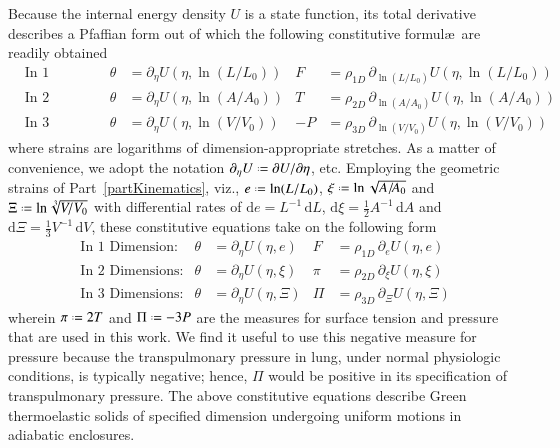 Because the internal energy density $U$ is a state function, its total derivative describes a Pfaffian form \cite{Caratheodory09} out of which the following constitutive formul\ae\ are readily obtained
\begin{subequations}
    \label{GreenElasticCEs}
    \begin{align}
    \mbox{} & \text{In 1 Dimension:} & 
    \theta & = \partial_{\eta} U ( \eta , \ln (L/L_0)) &
    F & = \rho_{1D} \, \partial_{\ln(L/L_0)} U ( \eta , \ln (L/L_0) ) \\
    \mbox{} & \text{In 2 Dimensions:} &
    \theta & = \partial_{\eta} U ( \eta , \ln (A / \! A_0) ) &
    T & = \rho_{2D} \, \partial_{\ln (A / \! A_0)} U ( \eta , \ln (A / A_0) ) \\
    \mbox{} & \text{In 3 Dimensions:} &
    \theta & = \partial_{\eta} U ( \eta , \ln (V \! / V_0) ) &
    -P & = \rho_{3D} \, \partial_{\ln (V \! / V_0)} U ( \eta , \ln (V \! / V_0) )
    \end{align}
\end{subequations}
where strains are logarithms of dimension-appropriate stretches.  As a matter of convenience, we adopt the notation $\partial_{\eta} U \defeq \partial U / \partial \eta$, etc.  Employing the geometric strains of Part~\ref{partKinematics}, viz., $e \defeq \ln ( L / L_0 )$, $\xi \defeq \ln \sqrt{ A / \! A_0 }$ and $\Xi \defeq \ln \sqrt[3]{V \! / V_0}$ with differential rates of $\mathrm{d} e = L^{-1} \, \mathrm{d}L$, $\mathrm{d} \xi = \tfrac{1}{2} A^{-1} \, \mathrm{d}A$ and $\mathrm{d} \Xi = \tfrac{1}{3} V^{-1} \, \mathrm{d}V$, these constitutive equations take on the following form
\begin{subequations}
    \label{uniformCEs}
    \begin{align}
    \mbox{} & \text{In 1 Dimension:} & 
    \theta & = \partial_{\eta} U ( \eta , e) &
    F & = \rho_{1D} \, \partial_e U ( \eta , e ) \\
    \mbox{} & \text{In 2 Dimensions:} &
    \theta & = \partial_{\eta} U ( \eta , \xi ) &
    \pi & = \rho_{2D} \, \partial_{\xi} U ( \eta , \xi ) \\
    \mbox{} & \text{In 3 Dimensions:} &
    \theta & = \partial_{\eta} U ( \eta , \Xi ) &
    \Pi & = \rho_{3D} \, \partial_{\Xi} U ( \eta , \Xi )
    \end{align}
\end{subequations}
wherein $\pi \defeq 2T$ and $\Pi \defeq -3P$ are the measures for surface tension and pressure that are used in this work.  We find it useful to use this negative measure for pressure because the transpulmonary pressure in lung, under normal physiologic conditions, is typically negative; hence, $\Pi$ would be positive in its specification of transpulmonary pressure.  The above constitutive equations describe Green thermo\-elastic solids of specified dimension undergoing uniform motions in adiabatic enclosures.

